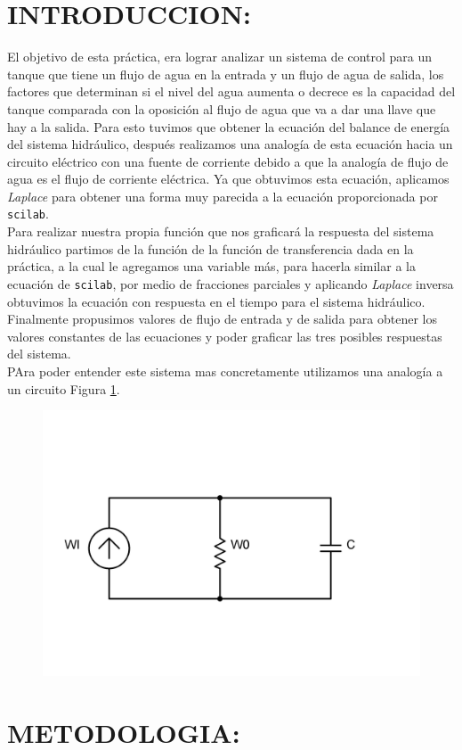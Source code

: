 \documentclass[letterpaper,10pt]{article}
\begin{document}
	\section{INTRODUCCION:}
	El objetivo de esta práctica, era lograr analizar un sistema de control para un tanque que tiene un flujo de
	agua en la entrada y un flujo de agua de salida, los factores que determinan si el nivel del agua aumenta o decrece 
	es la capacidad del tanque comparada con la oposición al flujo de agua que va a dar una llave que hay a la salida.
	Para esto tuvimos que obtener la ecuación del balance de energía del sistema hidráulico, después realizamos una analogía 
	de esta ecuación hacia un circuito eléctrico con una fuente de corriente debido a que la analogía de flujo de agua
	es el flujo de corriente eléctrica. Ya que obtuvimos esta ecuación, aplicamos \textit{Laplace} para obtener una forma muy parecida
	a la ecuación proporcionada por \texttt{scilab}.\\
	
	Para realizar nuestra propia función que nos graficará la respuesta del sistema hidráulico partimos de la función de 
	la función de transferencia dada en la práctica, a la cual le agregamos una variable más, para hacerla similar a
	la ecuación de \texttt{scilab}, por medio de fracciones parciales y aplicando \textit{Laplace} inversa obtuvimos la ecuación con respuesta en 
	el tiempo para el sistema hidráulico. Finalmente propusimos valores de flujo de entrada y de salida para obtener los valores
	constantes de las ecuaciones y poder graficar las tres posibles respuestas del sistema.\\
	PAra poder entender este sistema mas concretamente utilizamos una analogía a un circuito Figura \ref{fig:circ}.
	
	\begin{figure}[h!]
		\centering
		\includegraphics[width=0.4\linewidth]{circ}
		\caption{}
		\label{fig:circ}
	\end{figure}
	
	\section{METODOLOGIA:}
\end{document}
